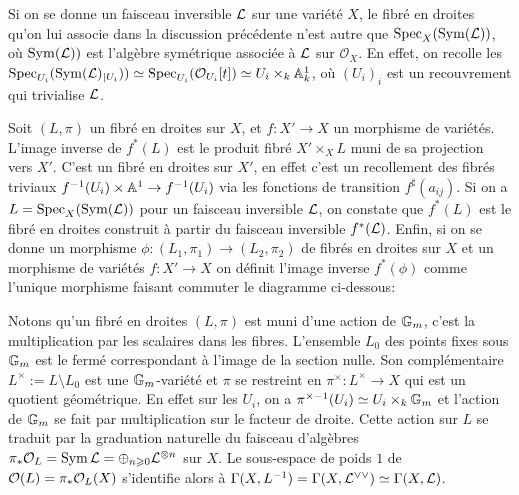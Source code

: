 \begin{rem}
Si on se donne un faisceau inversible $\mathcal{L}$ sur une variété $X$, le fibré en droites qu'on lui associe dans la discussion précédente n'est autre que $\operatorname{Spec}_X(\operatorname{Sym}(\mathcal{L}))$, où $\operatorname{Sym}(\mathcal{L}))$ est l'algèbre symétrique associée à $\mathcal{L}$ sur $\mathcal{O}_X$. En effet, on recolle les $\operatorname{Spec}_{U_i}(\operatorname{Sym}(\mathcal{L})_{|U_i}))\simeq\operatorname{Spec}_{U_i}( \mathcal{O}_{U_i}[t])\simeq U_i \times_k \mathbb{A}^1_k$, où $(U_i)_i$ est un recouvrement qui trivialise $\mathcal{L}$.
\end{rem}

Soit $(L,\pi)$ un fibré en droites sur $X$, et $f:X'\rightarrow X$ un morphisme de variétés. L'image inverse de $f^*(L)$ est le produit fibré $X'\times_X L$ muni de sa projection vers $X'$. C'est un fibré en droites sur $X'$, en effet c'est un recollement des fibrés triviaux $f^{-1}(U_i)\times \mathbb{A}^1\rightarrow f^{-1}(U_i)$ via les fonctions de transition $f^\sharp(a_{ij})$. Si on a $L=\operatorname{Spec}_X(\operatorname{Sym}(\mathcal{L}))$ pour un faisceau inversible $\mathcal{L}$, on constate que $f^*(L)$ est le fibré en droites construit à partir du faisceau inversible $f^*(\mathcal{L})$. Enfin, si on se donne un morphisme $\phi:(L_1,\pi_1)\rightarrow (L_2,\pi_2)$ de fibrés en droites sur $X$ et un morphisme de variétés $f:X'\rightarrow X$ on définit l'image inverse $f^*(\phi)$ comme l'unique morphisme faisant commuter le diagramme ci-dessous:

	\begin{center}
	\end{center}

\begin{rem}\label{remfibsectionsglobales}
Notons qu'un fibré en droites $(L, \pi)$ est muni d'une action de $\mathbb{G}_m$, c'est la multiplication par les scalaires dans les fibres. L'ensemble $L_0$ des points fixes sous $\mathbb{G}_m$ est le fermé correspondant à l'image de la section nulle. Son complémentaire $L^\times:=L\setminus L_0$ est une $\mathbb{G}_m$-variété et $\pi$ se restreint en $\pi^\times: L^\times \rightarrow X$ qui est un quotient géométrique. En effet sur les $U_i$, on a $\pi^{\times-1}(U_i) \simeq U_i\times_k \mathbb{G}_m$ et l'action de $\mathbb{G}_m$ se fait par multiplication sur le facteur de droite. Cette action sur $L$  se traduit par la graduation naturelle du faisceau d'algèbres $\pi_*\mathcal{O}_L=\operatorname{Sym}\mathcal{L}=\oplus_{n\geqslant 0}\mathcal{L}^{\otimes n}$ sur $X$. Le sous-espace de poids $1$ de $\mathcal{O}(L)=\pi_*\mathcal{O}_L(X)$ s'identifie alors à $\Gamma(X,L^{-1})=\Gamma(X,\mathcal{L}^{\vee\vee})\simeq\Gamma(X,\mathcal{L})$.
\end{rem}

